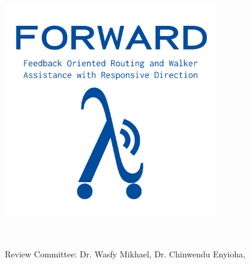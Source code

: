 
\begin{titlepage}
	
	\maketitle
	\thispagestyle{empty}
	\begin{center}
		\includegraphics[width=0.7\textwidth]{./Images/FORWARD_logo_type_blue.png}
	\end{center}

	\hfill \break \\[\baselineskip]

	\begin{center}
		Review Committee: Dr. Wasfy Mikhael, Dr. Chinwendu Enyioha, 
	\end{center}
	
	\centering
	\hfill \break \\[2\baselineskip]
	
	\fancyhf
	
\end{titlepage}